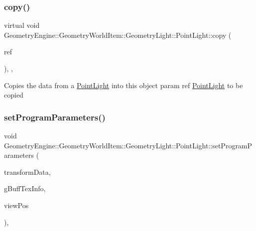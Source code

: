 \subsubsection{\texorpdfstring{copy()}{copy()}}
{\footnotesize\ttfamily virtual void Geometry\+Engine\+::\+Geometry\+World\+Item\+::\+Geometry\+Light\+::\+Point\+Light\+::copy (\begin{DoxyParamCaption}\item[{const \mbox{\hyperlink{class_geometry_engine_1_1_geometry_world_item_1_1_geometry_light_1_1_point_light}{Point\+Light}} \&}]{ref }\end{DoxyParamCaption})\hspace{0.3cm}{\ttfamily [inline]}, {\ttfamily [protected]}, {\ttfamily [virtual]}}

Copies the data from a \mbox{\hyperlink{class_geometry_engine_1_1_geometry_world_item_1_1_geometry_light_1_1_point_light}{Point\+Light}} into this object param ref \mbox{\hyperlink{class_geometry_engine_1_1_geometry_world_item_1_1_geometry_light_1_1_point_light}{Point\+Light}} to be copied \mbox{\label{class_geometry_engine_1_1_geometry_world_item_1_1_geometry_light_1_1_point_light_acf3ebd411b36d95ba26ae41bcc25793a}} 
\subsubsection{\texorpdfstring{setProgramParameters()}{setProgramParameters()}}
{\footnotesize\ttfamily void Geometry\+Engine\+::\+Geometry\+World\+Item\+::\+Geometry\+Light\+::\+Point\+Light\+::set\+Program\+Parameters (\begin{DoxyParamCaption}\item[{const \mbox{\hyperlink{class_geometry_engine_1_1_lighting_transformation_data}{Lighting\+Transformation\+Data}} \&}]{transform\+Data,  }\item[{const \mbox{\hyperlink{class_geometry_engine_1_1_g_buffer_texture_info}{G\+Buffer\+Texture\+Info}} \&}]{g\+Buff\+Tex\+Info,  }\item[{const Q\+Vector3D \&}]{view\+Pos }\end{DoxyParamCaption})\hspace{0.3cm}{\ttfamily [protected]}, {\ttfamily [virtual]}}

